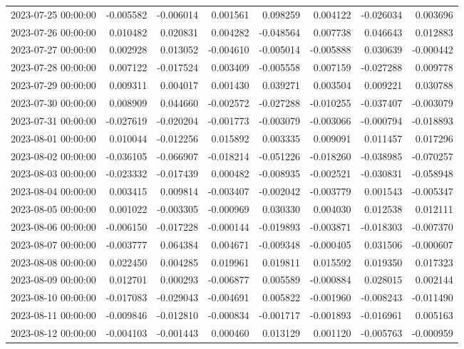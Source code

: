 \begin{tabular}{lrrrrrrr}
2023-07-25 00:00:00 & -0.005582 & -0.006014 & 0.001561 & 0.098259 & 0.004122 & -0.026034 & 0.003696 \\
2023-07-26 00:00:00 & 0.010482 & 0.020831 & 0.004282 & -0.048564 & 0.007738 & 0.046643 & 0.012883 \\
2023-07-27 00:00:00 & 0.002928 & 0.013052 & -0.004610 & -0.005014 & -0.005888 & 0.030639 & -0.000442 \\
2023-07-28 00:00:00 & 0.007122 & -0.017524 & 0.003409 & -0.005558 & 0.007159 & -0.027288 & 0.009778 \\
2023-07-29 00:00:00 & 0.009311 & 0.004017 & 0.001430 & 0.039271 & 0.003504 & 0.009221 & 0.030788 \\
2023-07-30 00:00:00 & 0.008909 & 0.044660 & -0.002572 & -0.027288 & -0.010255 & -0.037407 & -0.003079 \\
2023-07-31 00:00:00 & -0.027619 & -0.020204 & -0.001773 & -0.003079 & -0.003066 & -0.000794 & -0.018893 \\
2023-08-01 00:00:00 & 0.010044 & -0.012256 & 0.015892 & 0.003335 & 0.009091 & 0.011457 & 0.017296 \\
2023-08-02 00:00:00 & -0.036105 & -0.066907 & -0.018214 & -0.051226 & -0.018260 & -0.038985 & -0.070257 \\
2023-08-03 00:00:00 & -0.023332 & -0.017439 & 0.000482 & -0.008935 & -0.002521 & -0.030831 & -0.058948 \\
2023-08-04 00:00:00 & 0.003415 & 0.009814 & -0.003407 & -0.002042 & -0.003779 & 0.001543 & -0.005347 \\
2023-08-05 00:00:00 & 0.001022 & -0.003305 & -0.000969 & 0.030330 & 0.004030 & 0.012538 & 0.012111 \\
2023-08-06 00:00:00 & -0.006150 & -0.017228 & -0.000144 & -0.019893 & -0.003871 & -0.018303 & -0.007370 \\
2023-08-07 00:00:00 & -0.003777 & 0.064384 & 0.004671 & -0.009348 & -0.000405 & 0.031506 & -0.000607 \\
2023-08-08 00:00:00 & 0.022450 & 0.004285 & 0.019961 & 0.019811 & 0.015592 & 0.019350 & 0.017323 \\
2023-08-09 00:00:00 & 0.012701 & 0.000293 & -0.006877 & 0.005589 & -0.000884 & 0.028015 & 0.002144 \\
2023-08-10 00:00:00 & -0.017083 & -0.029043 & -0.004691 & 0.005822 & -0.001960 & -0.008243 & -0.011490 \\
2023-08-11 00:00:00 & -0.009846 & -0.012810 & -0.000834 & -0.001717 & -0.001893 & -0.016961 & 0.005163 \\
2023-08-12 00:00:00 & -0.004103 & -0.001443 & 0.000460 & 0.013129 & 0.001120 & -0.005763 & -0.000959 \\

\end{tabular}
